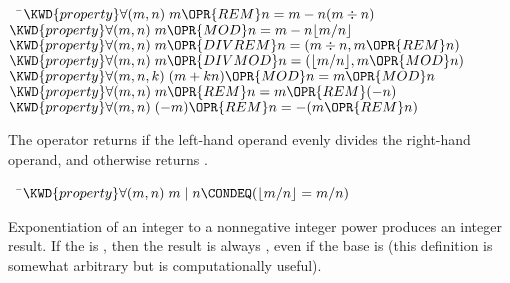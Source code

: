 \begin{Fortress}
{\tt~~}\pushtabs\=\+\(  \KWD{property} \forall (m, n)\; m \OPR{REM} n = m - n(m \div n)\)\\
\(  \KWD{property} \forall (m, n)\; m \OPR{MOD} n = m - n \lfloor m/n \rfloor\)\\
\(  \KWD{property} \forall (m, n)\; m \OPR{DIVREM} n = (m \div n, m \OPR{REM} n)\)\\
\(  \KWD{property} \forall (m, n)\; m \OPR{DIVMOD} n = ( \lfloor m/n \rfloor, m \OPR{MOD} n)\)\\
\(  \KWD{property} \forall (m, n, k)\; (m + k n) \OPR{MOD} n = m \OPR{MOD} n\)\\
\(  \KWD{property} \forall (m, n)\; m \OPR{REM} n = m \OPR{REM} (-n)\)\\
\(  \KWD{property} \forall (m, n)\; (-m) \OPR{REM} n = -(m \OPR{REM} n)\)\-\\\poptabs
\end{Fortress}



The operator \EXP{ \mid } returns  if the left-hand operand evenly divides the
right-hand operand, and otherwise returns .

\begin{Fortress}
{\tt~~}\pushtabs\=\+\(  \KWD{property} \forall (m, n)\;  m \mid n \CONDEQ (\lfloor m/n \rfloor = m/n)\)\-\\\poptabs
\end{Fortress}



Exponentiation of an integer to a nonnegative integer power produces an integer result.
If the  is , then the result is always , even if the base is 
(this definition is somewhat arbitrary but is computationally useful).

